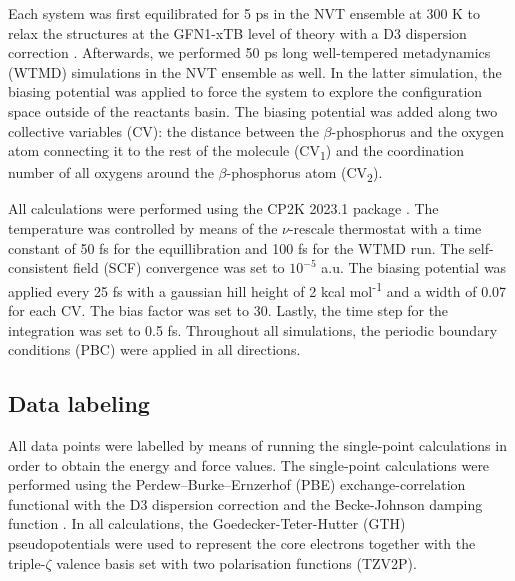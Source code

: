 Each system was first equilibrated for 5 ps in the NVT ensemble at 300 K to relax the structures at the GFN1-xTB level of theory with a D3 dispersion correction \citep{grimmeConsistentAccurateInitio2010}. Afterwards, we performed 50 ps long well-tempered metadynamics (WTMD) \citep{barducciWellTemperedMetadynamicsSmoothly2008} simulations in the NVT ensemble as well. In the latter simulation, the biasing potential was applied to force the system to explore the configuration space outside of the reactants basin. The biasing potential was added along two collective variables (CV): the distance between the $\beta$-phosphorus and the oxygen atom connecting it to the rest of the molecule (CV\textsubscript{1}) and the coordination number of all oxygens around the $\beta$-phosphorus atom (CV\textsubscript{2}). 

All calculations were performed using the CP2K 2023.1 package \citep{kuhneCP2KElectronicStructure2020}. The temperature was controlled by means of the $\nu$-rescale thermostat \citep{bussiCanonicalSamplingVelocity2007} with a time constant of 50 fs for the equillibration and 100 fs for the WTMD run. The self-consistent field (SCF) convergence was set to $10^{-5}$ a.u. The biasing potential was applied every 25 fs with a gaussian hill height of 2 kcal mol\textsuperscript{-1} and a width of 0.07 for each CV. The bias factor was set to 30. Lastly, the time step for the integration was set to 0.5 fs. Throughout all simulations, the periodic boundary conditions (PBC) were applied in all directions.



\subsection{Data labeling}
All data points were labelled by means of running the single-point calculations in order to obtain the energy and force values. The single-point calculations were performed using the Perdew–Burke–Ernzerhof (PBE) exchange-correlation functional \citep{perdewGeneralizedGradientApproximation1996} with the D3 dispersion correction and the Becke-Johnson damping function \citep{grimmeConsistentAccurateInitio2010,grimmeEffectDampingFunction2011}. In all calculations, the Goedecker-Teter-Hutter (GTH) pseudopotentials \citep{goedeckerSeparableDualspaceGaussian1996,hartwigsenRelativisticSeparableDualspace1998} were used to represent the core electrons together with the triple-$\zeta$ valence basis set with two polarisation functions (TZV2P).

